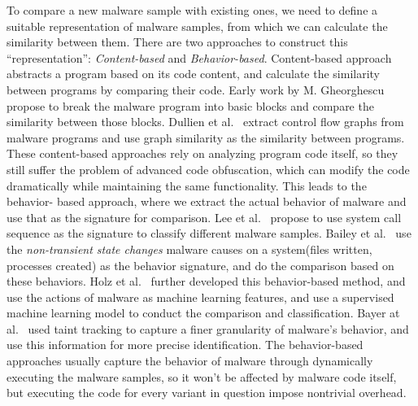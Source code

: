 To compare a new malware sample with existing ones, we need to define a 
suitable representation of malware samples, from which we can calculate 
the similarity between them. There are two approaches to construct this 
``representation'': \textit{Content-based} and \textit{Behavior-based}. 
Content-based approach abstracts a program based on its code content, and 
calculate the similarity between programs by comparing their code. 
Early work by M. Gheorghescu~\cite{Gheorghescu2006ANAV} propose 
to break the malware program into basic blocks and compare the similarity 
between those blocks.
Dullien et al.~\cite{dullien2005graph} extract control flow graphs from 
malware programs and use graph similarity as the similarity between programs.
These content-based approaches rely on analyzing program code itself, so 
they still suffer the problem of advanced code obfuscation, which can modify
the code dramatically while maintaining the same functionality. This leads to
the behavior-
based approach, where we extract the actual behavior of malware and use that
as the signature for comparison. Lee et al.~\cite{lee2006behavioral} propose
to use system call sequence as the signature to classify different malware
samples. Bailey et al.~\cite{bailey2007automated} use the \textit{non-transient
state changes} malware causes on a system(files written, processes created) as 
the behavior signature, and do the comparison based on these behaviors. Holz 
et al.~\cite{rieck2008learning} further developed this behavior-based method, 
and use the actions of malware as machine learning features, and use a 
supervised machine learning model to conduct the comparison and classification.
Bayer at al.~\cite{bayer2009scalable} used taint tracking to capture a finer
granularity of malware's behavior, and use this information for more precise
identification. The behavior-based approaches usually capture the behavior of
malware through dynamically executing the malware samples, so it won't be 
affected by malware code itself, but executing the code for every variant in
question impose nontrivial overhead. 

